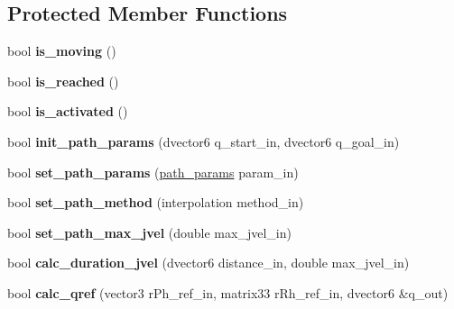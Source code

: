 \subsection*{Protected Member Functions}
\begin{DoxyCompactItemize}
\item 
\hypertarget{classhiroArm_aba39f63dd2153875add31e519c4f0bec}{bool {\bfseries is\-\_\-moving} ()}\label{classhiroArm_aba39f63dd2153875add31e519c4f0bec}

\item 
\hypertarget{classhiroArm_acbab538d5731a0ca75ce8ea0a1655e2a}{bool {\bfseries is\-\_\-reached} ()}\label{classhiroArm_acbab538d5731a0ca75ce8ea0a1655e2a}

\item 
\hypertarget{classhiroArm_a1b8d50022eda626bd07d3a054955aef0}{bool {\bfseries is\-\_\-activated} ()}\label{classhiroArm_a1b8d50022eda626bd07d3a054955aef0}

\item 
\hypertarget{classhiroArm_ab36d0bde0961fbcecd52f4c7fff7451d}{bool {\bfseries init\-\_\-path\-\_\-params} (dvector6 q\-\_\-start\-\_\-in, dvector6 q\-\_\-goal\-\_\-in)}\label{classhiroArm_ab36d0bde0961fbcecd52f4c7fff7451d}

\item 
\hypertarget{classhiroArm_a49540d781f6413b08a1d8dfd712a92c4}{bool {\bfseries set\-\_\-path\-\_\-params} (\hyperlink{structhiroArm_1_1path__params}{path\-\_\-params} param\-\_\-in)}\label{classhiroArm_a49540d781f6413b08a1d8dfd712a92c4}

\item 
\hypertarget{classhiroArm_ab06838ff1aba7110ab0db0a7097e2a9a}{bool {\bfseries set\-\_\-path\-\_\-method} (interpolation method\-\_\-in)}\label{classhiroArm_ab06838ff1aba7110ab0db0a7097e2a9a}

\item 
\hypertarget{classhiroArm_a941f7eeda27141a3efdaee615fe59fb8}{bool {\bfseries set\-\_\-path\-\_\-max\-\_\-jvel} (double max\-\_\-jvel\-\_\-in)}\label{classhiroArm_a941f7eeda27141a3efdaee615fe59fb8}

\item 
\hypertarget{classhiroArm_a49ac0e06be2efc2028f29140795f7805}{bool {\bfseries calc\-\_\-duration\-\_\-jvel} (dvector6 distance\-\_\-in, double max\-\_\-jvel\-\_\-in)}\label{classhiroArm_a49ac0e06be2efc2028f29140795f7805}

\item 
\hypertarget{classhiroArm_aec2145c201642786832db74c7f2017b7}{bool {\bfseries calc\-\_\-qref} (vector3 r\-Ph\-\_\-ref\-\_\-in, matrix33 r\-Rh\-\_\-ref\-\_\-in, dvector6 \&q\-\_\-out)}\label{classhiroArm_aec2145c201642786832db74c7f2017b7}


\end{DoxyCompactItemize}
